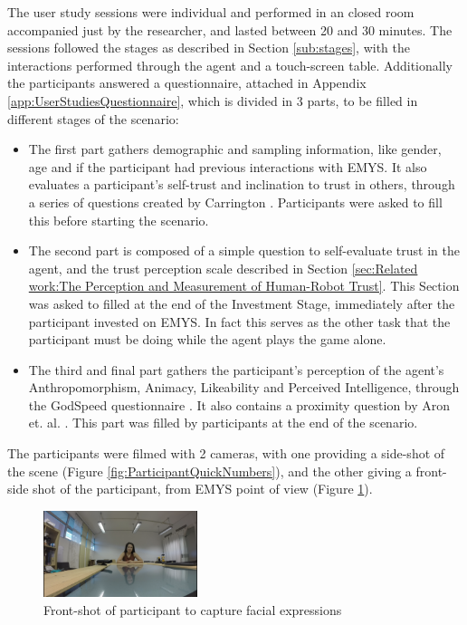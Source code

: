 The user study sessions were individual and performed in an closed room accompanied just by the researcher, and lasted between 20 and 30 minutes. The sessions followed the stages as described in Section \ref{sub:stages}, with the interactions performed through the agent and a touch-screen table. Additionally the participants answered a questionnaire, attached in Appendix \ref{app:UserStudiesQuestionnaire}, which is divided in 3 parts, to be filled in different stages of the scenario: 

\begin{itemize}
    \item The first part gathers demographic and sampling information, like gender, age and if the participant had previous interactions with \ac{EMYS}. It also evaluates a participant's self-trust and inclination to trust in others, through a series of questions created by Carrington \cite{Carrington2007}. Participants were asked to fill this before starting the scenario.
    \item The second part is composed of a simple question to self-evaluate trust in the agent, and the trust perception scale described in Section \ref{sec:Related work:The Perception and Measurement of Human-Robot Trust}. This Section was asked to filled at the end of the Investment Stage, immediately after the participant invested on \ac{EMYS}. In fact this serves as the other task that the participant must be doing while the agent plays the game alone.
    \item The third and final part gathers the participant's perception of the agent's Anthropomorphism, Animacy, Likeability and Perceived Intelligence, through the GodSpeed questionnaire \cite{Bartneck2009,Lehmann2015}. It also contains a proximity question by Aron et. al. \cite{Aron1992}. This part was filled by participants at the end of the scenario.
\end{itemize}

The participants were filmed with 2 cameras, with one providing a side-shot of the scene (Figure \ref{fig:ParticipantQuickNumbers}), and the other giving a front-side shot of the participant, from \ac{EMYS} point of view (Figure \ref{fig:ScenarioFrontShot}).

\begin{figure}[hbt]
    \centering
    \includegraphics[width=0.4\textwidth]{figures/ScenarioFrontShot.png}
    \caption{Front-shot of participant to capture facial expressions}
    \label{fig:ScenarioFrontShot}
\end{figure}


